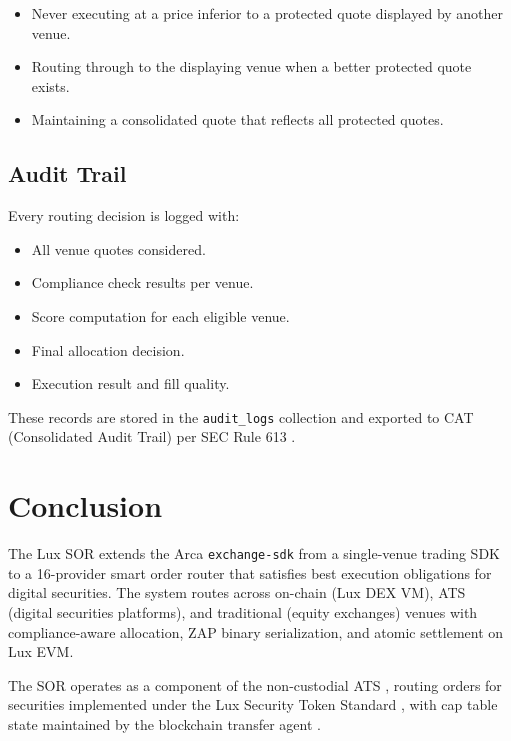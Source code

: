 \documentclass[11pt,a4paper]{article}
\begin{document}
\begin{itemize}[nosep]
  \item Never executing at a price inferior to a protected quote displayed by another venue.
  \item Routing through to the displaying venue when a better protected quote exists.
  \item Maintaining a consolidated quote that reflects all protected quotes.
\end{itemize}

\subsection{Audit Trail}

Every routing decision is logged with:

\begin{itemize}[nosep]
  \item All venue quotes considered.
  \item Compliance check results per venue.
  \item Score computation for each eligible venue.
  \item Final allocation decision.
  \item Execution result and fill quality.
\end{itemize}

These records are stored in the \texttt{audit\_logs} collection and exported to CAT (Consolidated Audit Trail) per SEC Rule 613 \cite{lux-ats-architecture}.

\section{Conclusion}

The Lux SOR extends the Arca \texttt{exchange-sdk} from a single-venue trading SDK to a 16-provider smart order router that satisfies best execution obligations for digital securities. The system routes across on-chain (Lux DEX VM), ATS (digital securities platforms), and traditional (equity exchanges) venues with compliance-aware allocation, ZAP binary serialization, and atomic settlement on Lux EVM.

The SOR operates as a component of the non-custodial ATS \cite{lux-ats-architecture}, routing orders for securities implemented under the Lux Security Token Standard \cite{lux-security-token-standard}, with cap table state maintained by the blockchain transfer agent \cite{lux-transfer-agent}.
\end{document}
